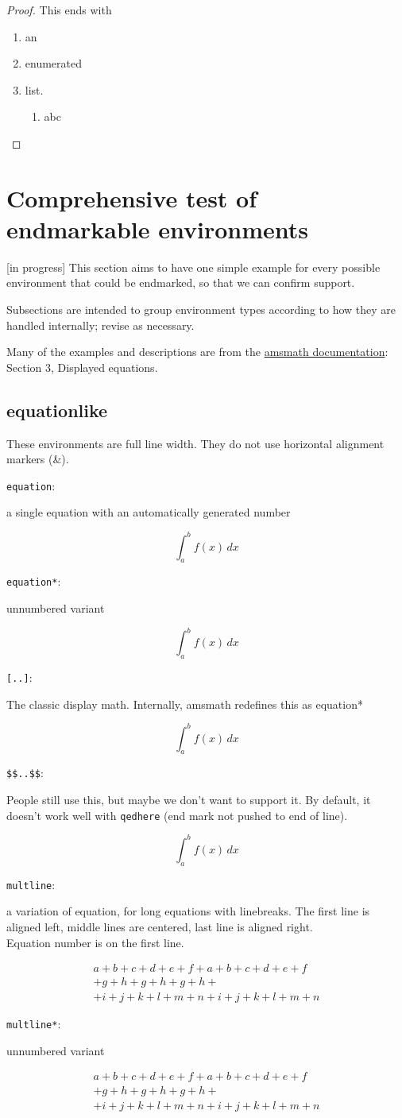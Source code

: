 \documentclass[leqno]{article}
\newcommand{\testtype}[2]{\texttt{#1}:%
  #2}
\newcommand{\makeoutertest}[3]{
  \begin{test}
    \testtype{#1}{#2}
    #3
  \end{test}
}
\newcommand{\maketest}[3]{
  \makeoutertest{#1}{#2}{
    \begin{#1}
      #3
    \end{#1}
  }
}
\begin{document}
\begin{proof}
  This ends with
  \begin{enumerate}
  \item an
  \item enumerated
  \item list.
  \begin{enumerate}
  \item abc
  \end{enumerate}
  \end{enumerate}
\end{proof}

\clearpage

\section{Comprehensive test of endmarkable environments}

[in progress] This section aims to have one simple example for every possible environment that could be endmarked, so that we can confirm support.

Subsections are intended to group environment types according to how they are handled internally; revise as necessary.

Many of the examples and descriptions are from  the \href{https://www.ams.org/arc/tex/amsmath/amsldoc.pdf}{amsmath documentation}: Section 3, Displayed equations.

\subsection{equationlike}

These environments are full line width.
They do not use horizontal alignment markers (\&).

\maketest{equation}{
  a single equation with an automatically generated number
}{
  \int_a^b f(x)\, dx
}
\maketest{equation*}{
  unnumbered variant
}{
  \int_a^b f(x)\, dx
}
\makeoutertest{[..]}{
  The classic display math.
  Internally, amsmath redefines this as equation*
}{
  \[
    \int_a^b f(x)\, dx
  \]
}
\makeoutertest{\$\$..\$\$}{
  People still use this, but maybe we don't want to support it.
  By default, it doesn't work well with \texttt{qedhere} (end mark not pushed to end of line).
}{
  $$ 
    \int_a^b f(x)\, dx
  $$
}

\maketest{multline}{
  a variation of equation, for long equations with linebreaks.
  The first line is aligned left, middle lines are centered, last line is aligned right.\\
  Equation number is on the first line.
}{
  a+b+c+d+e+f+ a+b+c+d+e+f\\
  +g+h+ g+h+ g+h+\\
  +i+j+k+l+m+n
  +i+j+k+l+m+n
}
\maketest{multline*}{
  unnumbered variant
}{
  a+b+c+d+e+f+ a+b+c+d+e+f\\
  +g+h+ g+h+ g+h+\\
  +i+j+k+l+m+n
  +i+j+k+l+m+n
}
\end{document}
